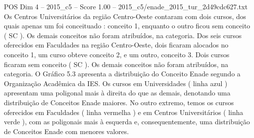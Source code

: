 \begin{textsample}{POS Dim 4 – 2015\_c5 – Score 1.00 – 2015\_c5/enade\_2015\_tur\_2d49cdc627.txt}
Os Centros Universitários da região Centro-Oeste contaram com dois cursos, dos quais apenas um foi conceituado : conceito 1, enquanto o outro ficou sem conceito ( SC ).
Os demais conceitos não foram atribuídos, na categoria.
Dos seis cursos oferecidos em Faculdades na região Centro-Oeste, dois ficaram alocados no conceito 1, um curso obteve conceito 2, e um outro, conceito 3.
Dois cursos ficaram sem conceito ( SC ).
Os demais conceitos não foram atribuídos, na categoria.
O Gráfico 5.3 apresenta a distribuição do Conceito Enade segundo a Organização Acadêmica da IES.
Os cursos em Universidades ( linha azul ) apresentam uma poligonal mais à direita do que as demais, denotando uma distribuição de Conceitos Enade maiores.
No outro extremo, temos os cursos oferecidos em Faculdades ( linha vermelha ) e em Centros Universitários ( linha verde ), com as poligonais mais à esquerda e, consequentemente, uma distribuição de Conceitos Enade com menores valores.

\end{textsample}

